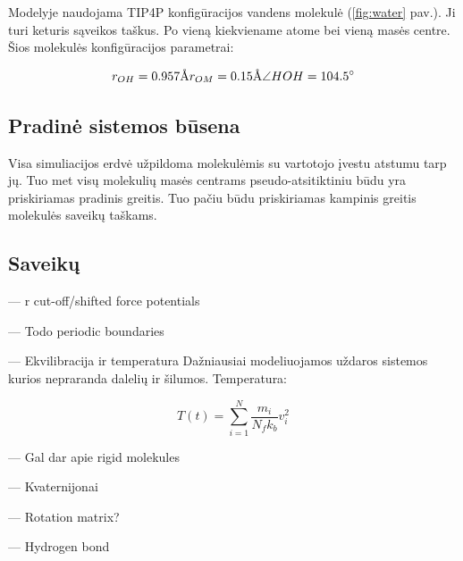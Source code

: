 Modelyje naudojama TIP4P konfigūracijos vandens molekulė (\ref{fig:water} pav.).
Ji turi keturis sąveikos taškus.
Po vieną kiekviename atome bei vieną masės centre.
Šios molekulės konfigūracijos parametrai:

\begin{equation} \label{eq:water_conf}
    r_{OH} = 0.957 \si{\angstrom} \\
    r_{OM} = 0.15 \si{\angstrom} \\
    \angle HOH = 104.5 \si{\degree}
\end{equation}


\subsection{Pradinė sistemos būsena}
\label{sec:initial_state}

Visa simuliacijos erdvė užpildoma molekulėmis su vartotojo įvestu atstumu tarp jų.
Tuo met visų molekulių masės centrams pseudo-atsitiktiniu būdu yra priskiriamas pradinis greitis.
Tuo pačiu būdu priskiriamas kampinis greitis molekulės saveikų taškams.


\subsection{Saveikų }
\label{sec:}

--- r cut-off/shifted force potentials

--- Todo periodic boundaries

--- Ekvilibracija ir temperatura
Dažniausiai modeliuojamos uždaros sistemos kurios nepraranda dalelių ir šilumos. Temperatura:

\begin{equation}
    T(t) = \sum\limits_{i=1}^N {\dfrac {m_i} {N_{f}k_{b}} v_i^2}
\end{equation}


--- Gal dar apie rigid molekules

--- Kvaternijonai

--- Rotation matrix?

--- Hydrogen bond
